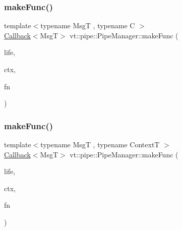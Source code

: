 \mbox{\label{structvt_1_1pipe_1_1_pipe_manager_aeade0c95a974823a05ba925167c82889}} 
\subsubsection{\texorpdfstring{make\+Func()}{makeFunc()}\hspace{0.1cm}{\footnotesize\ttfamily [2/6]}}
{\footnotesize\ttfamily template$<$typename MsgT , typename C $>$ \\
\hyperlink{namespacevt_a36db99df4c973d48b1118a293fff533f}{Callback}$<$MsgT$>$ vt\+::pipe\+::\+Pipe\+Manager\+::make\+Func (\begin{DoxyParamCaption}\item[{\hyperlink{namespacevt_1_1pipe_acb42b284378c0fdac1d7c6335dc26f58}{Lifetime\+Enum}}]{life,  }\item[{C $\ast$}]{ctx,  }\item[{\hyperlink{structvt_1_1pipe_1_1_pipe_manager_base_a73fdf82ece0411b3dc644c99b763f7a9}{Func\+Msg\+Ctx\+Type}$<$ MsgT, C $>$}]{fn }\end{DoxyParamCaption})}

\mbox{\label{structvt_1_1pipe_1_1_pipe_manager_a9ceec59c887d0fa1498b931c788962f6}} 
\subsubsection{\texorpdfstring{make\+Func()}{makeFunc()}\hspace{0.1cm}{\footnotesize\ttfamily [3/6]}}
{\footnotesize\ttfamily template$<$typename MsgT , typename ContextT $>$ \\
\hyperlink{namespacevt_a36db99df4c973d48b1118a293fff533f}{Callback}$<$MsgT$>$ vt\+::pipe\+::\+Pipe\+Manager\+::make\+Func (\begin{DoxyParamCaption}\item[{\hyperlink{namespacevt_1_1pipe_acb42b284378c0fdac1d7c6335dc26f58}{Lifetime\+Enum}}]{life,  }\item[{ContextT $\ast$}]{ctx,  }\item[{\hyperlink{structvt_1_1pipe_1_1_pipe_manager_base_a73fdf82ece0411b3dc644c99b763f7a9}{Func\+Msg\+Ctx\+Type}$<$ MsgT, ContextT $>$}]{fn }\end{DoxyParamCaption})}



